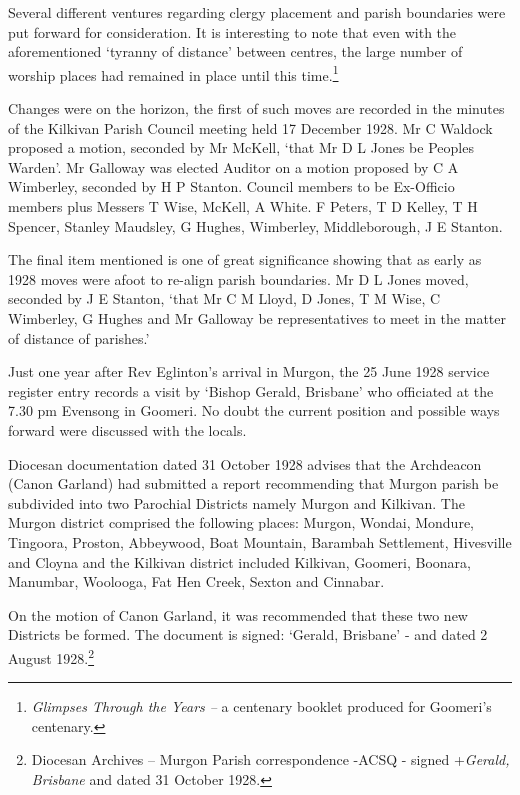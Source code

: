 Several different ventures regarding clergy placement and parish boundaries were put forward for consideration. It is interesting to note that even with the aforementioned `tyranny of distance' between centres, the large number of worship places had remained in place until this time.\footnote{\emph{Glimpses Through the Years --} a centenary booklet produced for Goomeri's centenary.}

Changes were on the horizon, the first of such moves are recorded in the minutes of the Kilkivan Parish Council meeting held 17 December 1928. Mr C Waldock proposed a motion, seconded by Mr McKell, `that Mr D L Jones be Peoples Warden'. Mr Galloway was elected Auditor on a motion proposed by C A Wimberley, seconded by H P Stanton. Council members to be Ex-Officio members plus Messers T Wise, McKell, A White. F Peters, T D Kelley, T H Spencer, Stanley Maudsley, G Hughes, Wimberley, Middleborough, J E Stanton.

The final item mentioned is one of great significance showing that as early as 1928 moves were afoot to re-align parish boundaries. Mr D L Jones moved, seconded by J E Stanton, `that Mr C M Lloyd, D Jones, T M Wise, C Wimberley, G Hughes and Mr Galloway be representatives to meet in the matter of distance of parishes.'

Just one year after Rev Eglinton's arrival in Murgon, the 25 June 1928 service register entry records a visit by `Bishop Gerald, Brisbane' who officiated at the 7.30 pm Evensong in Goomeri. No doubt the current position and possible ways forward were discussed with the locals.

Diocesan documentation dated 31 October 1928 advises that the Archdeacon (Canon Garland) had submitted a report recommending that Murgon parish be subdivided into two Parochial Districts namely Murgon and Kilkivan. The Murgon district comprised the following places: Murgon, Wondai, Mondure, Tingoora, Proston, Abbeywood, Boat Mountain, Barambah Settlement, Hivesville and Cloyna and the Kilkivan district included Kilkivan, Goomeri, Boonara, Manumbar, Woolooga, Fat Hen Creek, Sexton and Cinnabar.

On the motion of Canon Garland, it was recommended that these two new Districts be formed. The document is signed: `Gerald, Brisbane' - and dated 2 August 1928.\footnote{Diocesan Archives -- Murgon Parish correspondence -ACSQ - signed +\emph{Gerald, Brisbane} and dated 31 October 1928.}

